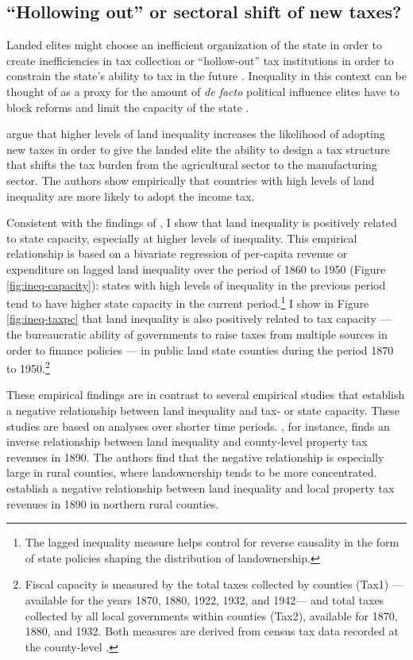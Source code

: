 \subsection{``Hollowing out'' or sectoral shift of new taxes?}
	
Landed elites might choose an inefficient organization of the state in order to create inefficiencies in tax collection \citep{acemoglu2011emergence} or ``hollow-out'' tax institutions in order to constrain the state's ability to tax in the future \citep{suryanarayan2017hollowing}. Inequality in this context can be thought of as a proxy for the amount of \emph{de facto} political influence elites have to block reforms and limit the capacity of the state \citep{acemoglu2008persistence}.

\citet{mares2015non} argue that higher levels of land inequality increases the likelihood of adopting new taxes in order to give the landed elite the ability to design a tax structure that shifts the tax burden from the agricultural sector to the manufacturing sector. The authors show empirically that countries with high levels of land inequality are more likely to adopt the income tax. 

Consistent with the findings of \citet{mares2015non}, I show that land inequality is positively related to state capacity, especially at higher levels of inequality. This empirical relationship is based on a bivariate regression of per-capita revenue or expenditure on lagged land inequality over the period of 1860 to 1950 (Figure \ref{fig:ineq-capacity}): states with high levels of inequality in the previous period tend to have higher state capacity in the current period.\footnote{The lagged inequality measure helps control for reverse causality in the form of state policies shaping the distribution of landownership.} I show in Figure \ref{fig:ineq-taxpc} that land inequality is also positively related to tax capacity --- the bureaucratic ability of governments to raise taxes from multiple sources in order to finance policies --- in public land state counties during the period 1870 to 1950.\footnote{Fiscal capacity is measured by the total taxes collected by counties (Tax1) --- available for the years 1870, 1880, 1922, 1932, and 1942--- and total taxes collected by all local governments within counties (Tax2), available for 1870, 1880, and 1932. Both measures are derived from census tax data recorded at the county-level \citep{rhode2003assessing,haines2010}.}

These empirical findings are in contrast to several empirical studies that establish a negative relationship between land inequality and tax- or state capacity. These studies are based on analyses over shorter time periods. \citet{ramcharan2010inequality}, for instance, finds an inverse relationship between land inequality and county-level property tax revenues in 1890. The authors find that the negative relationship is especially large in rural counties, where landownership tends to be more concentrated. \citet{vollrath2013inequality} establish a negative relationship between land inequality and local property tax revenues in 1890 in northern rural counties. 

